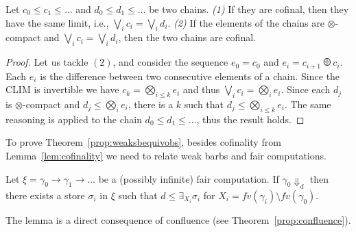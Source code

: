 \documentclass[main.tex]{subfiles}
\begin{document}
\begin{lemma}\label{lem:cofinality} 
Let $c_0 \leq c_1 \leq \dots$ and $d_0 \leq d_1 \leq \dots $ be two chains. \emph{(1)} If they are cofinal, then they have the same limit, i.e., $\bigvee_i c_i = \bigvee_i d_i$. \emph{(2)} If the elements of the chains are $\otimes$-compact and $\bigvee_i c_i = \bigvee_i d_i$, then the two chains are cofinal.\end{lemma}
\begin{proof}
Let us tackle $(2)$, and consider the sequence $e_0 = c_0$ and $e_{i} = c_{i+1} \odiv c_i$.
Each $e_i$ is the difference between two consecutive elements of a chain.
%
Since the CLIM is invertible we have $c_k =  \bigotimes_{i \leq k} e_i$ and thus
$\bigvee_i c_i = \bigotimes_i e_i$. Since each $d_j$ is $\otimes$-compact and
$d_j \leq \bigotimes_i e_i$, there is a $k$ such that $d_j \leq \bigotimes_{i \leq k} e_i$.
The same reasoning is applied to the chain $d_0 \leq d_1 \leq \dots $, thus
the result holds.
\end{proof}


To prove Theorem~\ref{prop:weaksbequivobs}, besides cofinality from Lemma~\ref{lem:cofinality} we need to relate weak barbs and fair computations.

\begin{lemma}\label{lem:barbsfair}
Let $\xi = \gamma_0 \longrightarrow \gamma_1 \longrightarrow \ldots$ be a (possibly infinite) fair computation. If $\gamma_0 \Downarrow_d$ then there exists a store $\sigma_i$ in $\xi$ such that $d \leq \exists_{X_i} \sigma_i$ for $X_i = fv(\gamma_i) \setminus fv(\gamma_0)$.
\end{lemma}

The lemma is a direct consequence of confluence (see Theorem~\ref{prop:confluence}).
\end{document}
